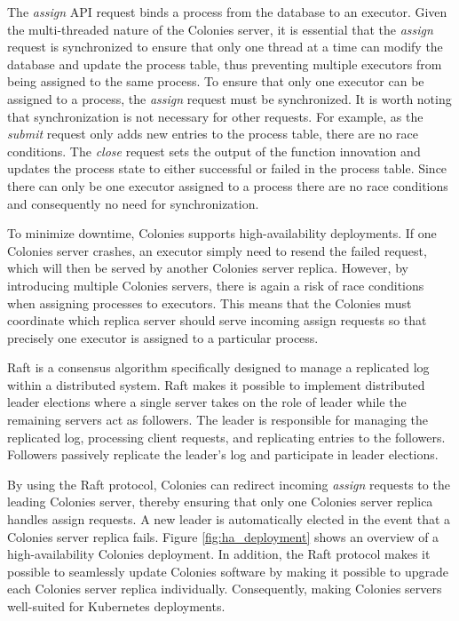 \documentclass{article}
\begin{document}
The \emph{assign} API request binds a process from the database to an executor. Given the multi-threaded nature of the Colonies server, it is essential that the \emph{assign} request is synchronized to ensure that only one thread at a time can modify the database and update the process table, thus preventing multiple executors from being assigned to the same process. To ensure that only one executor can be assigned to a process, the \emph{assign} request must be synchronized. It is worth noting that synchronization is not necessary for other requests. For example, as the \emph{submit} request only adds new entries to the process table, there are no race conditions. The \emph{close} request sets the output of the function innovation and updates the process state to either successful or failed in the process table. Since there can only be one executor assigned to a process there are no race conditions and consequently no need for synchronization.

To minimize downtime, Colonies supports high-availability deployments. If one Colonies server crashes, an executor simply need to resend the failed request, which will then be served by another Colonies server replica. However, by introducing multiple Colonies servers, there is again a risk of race conditions when assigning processes to executors. This means that the Colonies must coordinate which replica server should serve incoming assign requests so that precisely one executor is assigned to a particular process.

Raft \cite{raft} is a consensus algorithm specifically designed to manage a replicated log within a distributed system. Raft makes it possible to implement distributed leader elections where a single server takes on the role of leader while the remaining servers act as followers. The leader is responsible for managing the replicated log, processing client requests, and replicating entries to the followers. Followers passively replicate the leader's log and participate in leader elections. 

By using the Raft protocol, Colonies can redirect incoming \emph{assign} requests to the leading Colonies server, thereby ensuring that only one Colonies server replica handles assign requests. A new leader is automatically elected in the event that a Colonies server replica fails. Figure \ref{fig:ha_deployment} shows an overview of a high-availability Colonies deployment. In addition, the Raft protocol makes it possible to seamlessly update Colonies software by making it possible to upgrade each Colonies server replica individually. Consequently, making Colonies servers well-suited for Kubernetes deployments.
\end{document}
